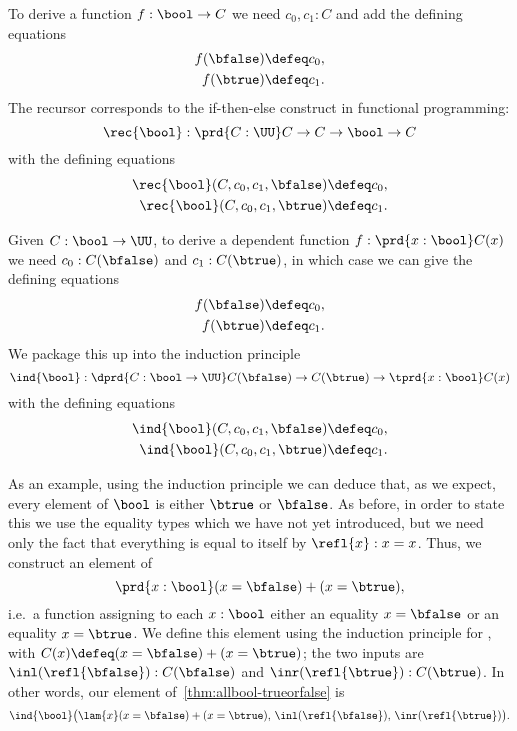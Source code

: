 To derive a function $f : \bool \to C$ we need $c_0,c_1 : C$ and
add the defining equations
\begin{align*}
  f(\bfalse) &\defeq c_0, \\
  f(\btrue)  &\defeq c_1.
\end{align*}
The recursor corresponds to the if-then-else construct in
functional programming:
%
\[ \rec{\bool} : \prd{C:\UU}  C \to C \to \bool \to C \]
with the defining equations
\begin{align*}
  \rec{\bool}(C,c_0,c_1,\bfalse) &\defeq c_0, \\
  \rec{\bool}(C,c_0,c_1,\btrue)  &\defeq c_1.
\end{align*}

Given $C : \bool \to \UU$, to derive a dependent function 
$f : \prd{x:\bool}C(x)$ we need $c_0:C(\bfalse)$ and $c_1 : C(\btrue)$, in which case we can give the defining equations
\begin{align*}
  f(\bfalse) &\defeq c_0, \\
  f(\btrue)  &\defeq c_1.
\end{align*}
We package this up into the induction principle
%
\[ \ind{\bool} : \dprd{C:\bool \to \UU}  C(\bfalse) \to C(\btrue)
\to \tprd{x:\bool} C(x) \]
with the defining equations
\begin{align*}
  \ind{\bool}(C,c_0,c_1,\bfalse) &\defeq c_0, \\
  \ind{\bool}(C,c_0,c_1,\btrue)  &\defeq c_1.
\end{align*}

As an example, using the induction principle we can deduce that, as we expect, every element of $\bool$ is either $\btrue$ or $\bfalse$.
As before, in order to state this we use the equality types which we have not yet introduced, but we need only the fact that everything is equal to itself by $\refl{x}:x=x$.
Thus, we construct an element of
\begin{equation}\label{thm:allbool-trueorfalse}
  \prd{x:\bool}(x=\bfalse)+(x=\btrue),
\end{equation}
i.e.\ a function assigning to each $x:\bool$ either an equality $x=\bfalse$ or an equality $x=\btrue$.
We define this element using the induction principle for \bool, with $C(x) \defeq (x=\bfalse)+(x=\btrue)$;
the two inputs are $\inl(\refl{\bfalse}) : C(\bfalse)$ and $\inr(\refl{\btrue}):C(\btrue)$.
In other words, our element of~\eqref{thm:allbool-trueorfalse} is
\[ \ind{\bool}\big(\lam{x}(x=\bfalse)+(x=\btrue),\, \inl(\refl{\bfalse}),\, \inr(\refl{\btrue})\big). \]


